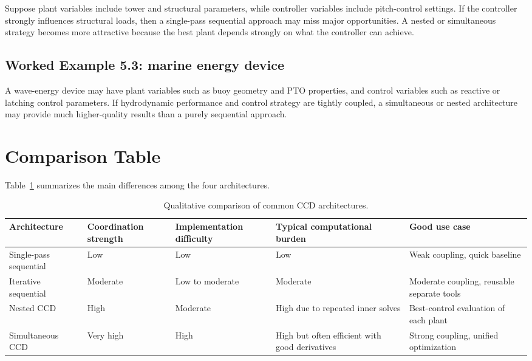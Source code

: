 \documentclass[11pt]{article}
\begin{document}
Suppose plant variables include tower and structural parameters, while controller variables include pitch-control settings. If the controller strongly influences structural loads, then a single-pass sequential approach may miss major opportunities. A nested or simultaneous strategy becomes more attractive because the best plant depends strongly on what the controller can achieve.

\subsection{Worked Example 5.3: marine energy device}

A wave-energy device may have plant variables such as buoy geometry and PTO properties, and control variables such as reactive or latching control parameters. If hydrodynamic performance and control strategy are tightly coupled, a simultaneous or nested architecture may provide much higher-quality results than a purely sequential approach.

\section{Comparison Table}

Table~\ref{tab:ch5-compare} summarizes the main differences among the four architectures.

\begin{table}[H]
\centering
\caption{Qualitative comparison of common CCD architectures.}
\label{tab:ch5-compare}
\begin{tabular}{>{\raggedright\arraybackslash}p{2.5cm} >{\raggedright\arraybackslash}p{2.8cm} >{\raggedright\arraybackslash}p{2.5cm} >{\raggedright\arraybackslash}p{2.6cm} >{\raggedright\arraybackslash}p{2.4cm}}
\toprule
Architecture & Coordination strength & Implementation difficulty & Typical computational burden & Good use case \\
\midrule
Single-pass sequential & Low & Low & Low & Weak coupling, quick baseline \\
Iterative sequential & Moderate & Low to moderate & Moderate & Moderate coupling, reusable separate tools \\
Nested CCD & High & Moderate & High due to repeated inner solves & Best-control evaluation of each plant \\
Simultaneous CCD & Very high & High & High but often efficient with good derivatives & Strong coupling, unified optimization \\
\bottomrule
\end{tabular}
\end{table}
\end{document}
